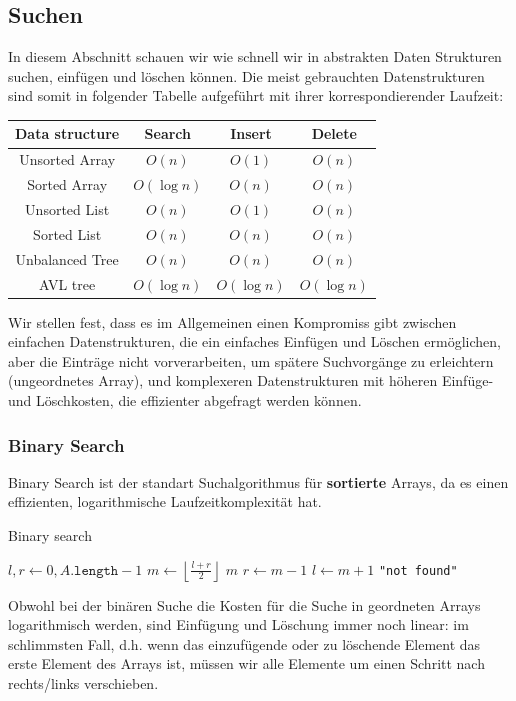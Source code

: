 \documentclass[a4paper]{article}
\begin{document}
\subsection{Suchen}
    In diesem Abschnitt schauen wir wie schnell wir in abstrakten Daten Strukturen suchen, einfügen und löschen können. Die meist gebrauchten Datenstrukturen sind somit in folgender Tabelle aufgeführt mit ihrer korrespondierender Laufzeit: \\
\begin{center}      
\begin{tabular} {|c|c|c|c|}
  \hline
  \label{Tab: LaufzeitenSuchSortier}
  \bfseries Data structure & \bfseries Search & \bfseries Insert & \bfseries Delete\\
  \hline
  Unsorted Array	&$O(n)$				&$O(1)$			&$O(n)$\\
  Sorted Array		&$O(\log{n})$	          	&$O(n)$			&$O(n)$\\
  Unsorted List 	&$O(n)$				&$O(1)$			&$O(n)$\\	
  Sorted List		&$O(n)$				&$O(n)$			&$O(n)$\\	
  Unbalanced Tree	&$O(n)$				&$O(n)$			&$O(n)$\\
  AVL tree		&$O(\log{n})$	        	&$O(\log{n})$	        &$O(\log{n})$\\
  \hline
\end{tabular}
\end{center}  
Wir stellen fest, dass es im Allgemeinen einen Kompromiss gibt zwischen einfachen Datenstrukturen, die ein einfaches Einfügen und Löschen ermöglichen, aber die Einträge nicht vorverarbeiten, um spätere Suchvorgänge zu erleichtern (ungeordnetes Array), und komplexeren Datenstrukturen mit höheren Einfüge- und Löschkosten, die effizienter abgefragt werden können.

\subsubsection{Binary Search} \label{BinarySearch}
    Binary Search ist der standart Suchalgorithmus für \textbf{sortierte} Arrays, da es einen effizienten, logarithmische Laufzeitkomplexität hat.

\begin{algorithm}
\caption{Binary search} 
\label{alg:BinarySearch}
\begin{algorithmic}[1] 
   
  \State $l, r \gets 0, A\texttt{.length}-1$
  \State $m \gets \left\lfloor \frac{l+r}{2} \right\rfloor$
  \State \Return $m$
  \State $r \gets m-1$
  \Else
  \State $l \gets m+1$
  \EndIf
  \EndWhile
  \State \Return \texttt{"not found"}
  \EndFunction
\end{algorithmic}
\end{algorithm}
Obwohl bei der binären Suche die Kosten für die Suche in geordneten Arrays logarithmisch werden, sind Einfügung und Löschung immer noch linear: im schlimmsten Fall, d.h. wenn das einzufügende oder zu löschende Element das erste Element des Arrays ist, müssen wir alle Elemente um einen Schritt nach rechts/links verschieben.
\end{document}
